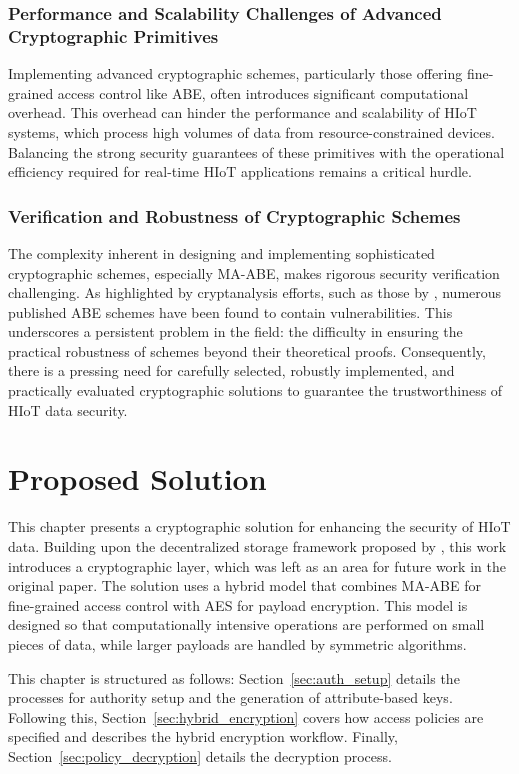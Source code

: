 \documentclass[cic,tc,english]{iiufrgs}
\numberwithin{algorithm}{chapter}
\begin{document}
        \subsection{Performance and Scalability Challenges of Advanced Cryptographic Primitives}
            Implementing advanced cryptographic schemes, particularly those offering fine-grained access control like ABE, often introduces significant computational overhead. This overhead can hinder the performance and scalability of HIoT systems, which process high volumes of data from resource-constrained devices. Balancing the strong security guarantees of these primitives with the operational efficiency required for real-time HIoT applications remains a critical hurdle.

        \subsection{Verification and Robustness of Cryptographic Schemes}
            The complexity inherent in designing and implementing sophisticated cryptographic schemes, especially MA-ABE, makes rigorous security verification challenging. As highlighted by cryptanalysis efforts, such as those by \citet{broken2020}, numerous published ABE schemes have been found to contain vulnerabilities. This underscores a persistent problem in the field: the difficulty in ensuring the practical robustness of schemes beyond their theoretical proofs. Consequently, there is a pressing need for carefully selected, robustly implemented, and practically evaluated cryptographic solutions to guarantee the trustworthiness of HIoT data security.

\chapter{Proposed Solution}
    \label{chap:proposedsolution}

    This chapter presents a cryptographic solution for enhancing the security of HIoT data. Building upon the decentralized storage framework proposed by \citet{laura2023}, this work introduces a cryptographic layer, which was left as an area for future work in the original paper. The solution uses a hybrid model that combines MA-ABE for fine-grained access control with AES for payload encryption. This model is designed so that computationally intensive operations are performed on small pieces of data, while larger payloads are handled by symmetric algorithms.

    This chapter is structured as follows: Section~\ref{sec:auth_setup} details the processes for authority setup and the generation of attribute-based keys. Following this, Section~\ref{sec:hybrid_encryption} covers how access policies are specified and describes the hybrid encryption workflow. Finally, Section~\ref{sec:policy_decryption} details the decryption process.
\end{document}
